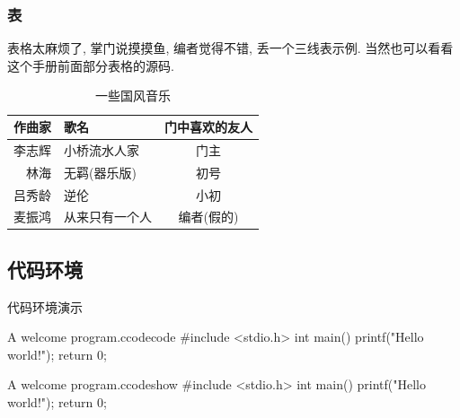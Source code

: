 \documentclass[hyperref,UTF8,11pt,CJK,handout]{beamer}
\begin{document}
\cprotEnv\begin{frame}
	\frametitle{表}
	表格太麻烦了, 掌门说摸摸鱼, 编者觉得不错, 丢一个三线表示例. 当然也可以看看这个手册前面部分表格的源码.
	\begin{table}[htbp]
		\centering
		\caption{一些国风音乐}
		\label{tab:YixieGfyy}
		\begin{tabular}{rlc}
			\toprule
			作曲家 & 歌名 & 门中喜欢的友人 \\
			\midrule
			李志辉 & 小桥流水人家 & 门主 \\
			林海 & 无羁(器乐版) & 初号 \\
			吕秀龄 & 逆伦 & 小初 \\
			麦振鸿 & 从来只有一个人 & 编者(假的) \\
			\bottomrule
		\end{tabular}
	\end{table}
\end{frame}

\subsection{代码环境}
\begin{frame}[fragile]{代码环境演示}
	\begin{scucode}[]{A welcome program.}{c}{}{codecode}
#include <stdio.h>
int main() {
    printf("Hello world!\n");
    return 0;
}
\end{scucode}
	\begin{scushow}[]{A welcome program.}{c}{}{codeshow}
#include <stdio.h>
int main() {
    printf("Hello world!\n");
    return 0;
}
\end{scushow}
\end{frame}
\end{document}
